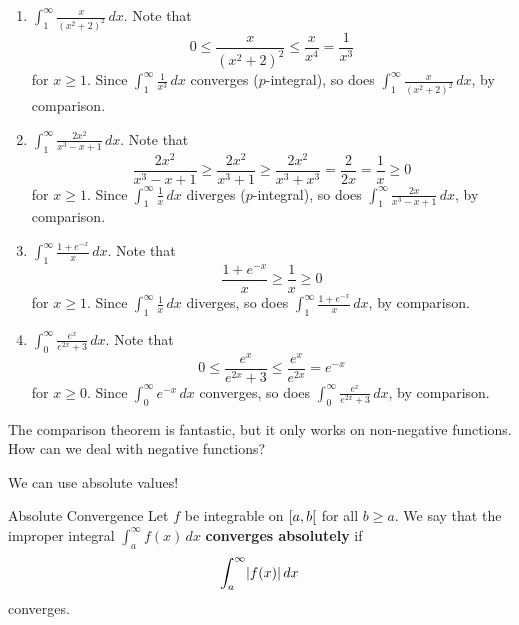\begin{Example}{}{}
    \begin{enumerate}[label=(\roman*)]
        \item $ \int_{1}^{\infty} \frac{x}{(x^2+2)^2}\, d{x} $. Note that
              \[ 0\leqslant \frac{x}{(x^2+2)^2}\leqslant \frac{x}{x^4}=\frac{1}{x^3}  \]
              for $ x\geqslant 1 $. Since $ \int_{1}^{\infty} \frac{1}{x^3} \, d{x}  $
              converges ($ p $-integral), so does $ \int_{1}^{\infty} \frac{x}{(x^2+2)^2} \, d{x} $,
              by comparison.
        \item $ \int_{1}^{\infty} \frac{2x^2}{x^3-x+1} \, d{x}  $. Note that
              \[ \frac{2x^2}{x^3-x+1} \geqslant \frac{2x^2}{x^3+1} \geqslant \frac{2x^2}{x^3+x^3}=
                  \frac{2}{2x} =\frac{1}{x}\geqslant 0 \]
              for $ x\geqslant 1 $. Since $ \int_{1}^{\infty} \frac{1}{x} \, d{x}  $
              diverges ($ p $-integral), so does $ \int_{1}^{\infty} \frac{2x}{x^3-x+1} \, d{x} $,
              by comparison.
        \item $ \int_{1}^{\infty} \frac{1+e^{-x}}{x} \, d{x} $. Note that
              \[ \frac{1+e^{-x}}{x} \geqslant \frac{1}{x} \geqslant 0 \]
              for $ x\geqslant 1 $. Since $ \int_{1}^{\infty} \frac{1}{x} \, d{x}  $ diverges,
              so does $ \int_{1}^{\infty} \frac{1+e^{-x}}{x} \, d{x}  $, by comparison.
        \item $ \int_{0}^{\infty} \frac{e^x}{e^{2x}+3} \, d{x}  $. Note that
              \[ 0\leqslant \frac{e^{x}}{e^{2x}+3} \leqslant \frac{e^{x}}{e^{2x}} =e^{-x} \]
              for $ x\geqslant 0 $. Since $ \int_{0}^{\infty} e^{-x}\, d{x}  $ converges,
              so does $ \int_{0}^{\infty} \frac{e^{x}}{e^{2x}+3} \, d{x}  $, by comparison.
    \end{enumerate}
\end{Example}

The comparison theorem is fantastic, but it only works on non-negative functions. How
can we deal with negative functions?

We can use absolute values!

\begin{Definition}{Absolute Convergence}{}
    Let $ f $ be integrable on $ \interval[open right]{a}{b} $ for all $ b\geqslant a $.
    We say that the improper integral $ \int_{a}^{\infty} f(x)\, d{x} $
    \textbf{converges absolutely} if
    \[ \int_{a}^{\infty} \lvert f(x)\rvert\, d{x}  \]
    converges.
\end{Definition}

